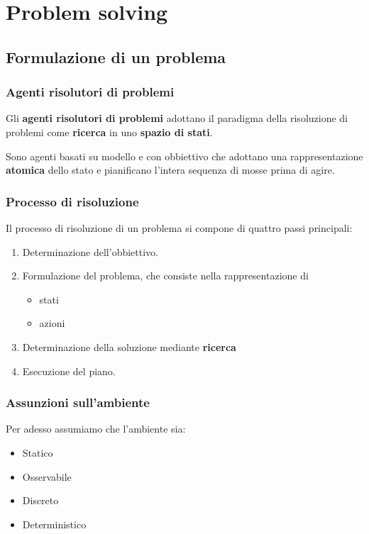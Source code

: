 \chapter{Problem solving}
\section{Formulazione di un problema}
\subsection{Agenti risolutori di problemi}
Gli \textbf{agenti risolutori di problemi} adottano il paradigma della risoluzione di
problemi come \textbf{ricerca} in uno \textbf{spazio di stati}.

Sono agenti basati su modello e con obbiettivo che adottano una rappresentazione
\textbf{atomica} dello stato e pianificano l'intera sequenza di mosse prima di agire.

\subsection{Processo di risoluzione}
Il processo di risoluzione di un problema si compone di quattro passi principali:
\begin{enumerate}
	\item Determinazione dell'obbiettivo.
	\item Formulazione del problema, che consiste nella rappresentazione di
	      \begin{itemize}
		      \item stati
		      \item azioni
	      \end{itemize}
	\item Determinazione della soluzione mediante \textbf{ricerca}
	\item Esecuzione del piano.
\end{enumerate}

\subsection{Assunzioni sull'ambiente}
Per adesso assumiamo che l'ambiente sia:
\begin{itemize}
	\item Statico
	\item Osservabile
	\item Discreto
	\item Deterministico
\end{itemize}

